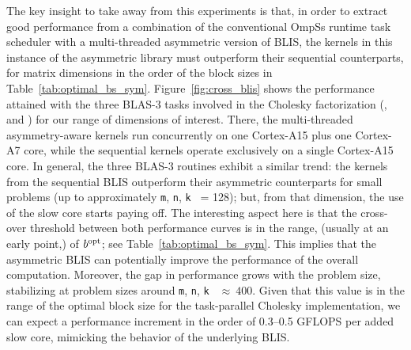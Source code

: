 The key insight to take away from this experiments is that,
in order to extract good performance from a combination of the conventional OmpSs runtime task scheduler 
with a multi-threaded asymmetric version of BLIS, the kernels in this instance of the asymmetric library must outperform
their sequential counterparts, for matrix dimensions in the order of the block sizes in Table~\ref{tab:optimal_bs_sym}.  
Figure~\ref{fig:cross_blis} shows the performance attained
with the three BLAS-3 tasks involved in the Cholesky factorization (\gemm, \syrk and \trsm) for our range of dimensions of interest. 
There, the multi-threaded asymmetry-aware kernels run concurrently on one Cortex-A15 plus one Cortex-A7 core, while
the sequential kernels operate exclusively on a single Cortex-A15 core. 
In general, the three BLAS-3 routines exhibit a similar trend: the kernels from the sequential BLIS
outperform their asymmetric counterparts for small problems (up to 
approximately {\tt m}, {\tt n}, {\tt k } = 128); but,
from that dimension, the use of the slow core starts paying off. The interesting aspect here is that
the cross-over threshold between both performance curves is in the range, (usually at an early point,) 
of $b^{\mbox{\rm \scriptsize opt}}$; see Table~\ref{tab:optimal_bs_sym}. This implies 
that the asymmetric BLIS can potentially improve the performance of the overall computation. 
Moreover, the gap in performance grows with the problem size, 
stabilizing at problem sizes around {\tt m}, {\tt n}, {\tt k } $\approx~400$. 
Given that this value is in the range of the optimal block size for the task-parallel Cholesky implementation, 
we can expect a performance increment in the order of 0.3--0.5 GFLOPS per added slow core, 
mimicking the behavior of the underlying BLIS.

